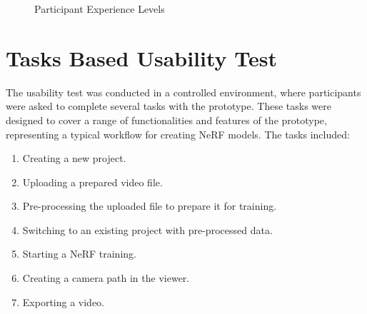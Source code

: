 \begin{figure}[htb]
  \centering
  \caption{Participant Experience Levels}
  \label{fig:study:experience}  
\end{figure}

\section{Tasks Based Usability Test}
\label{sec:study:tasks}

The usability test was conducted in a controlled environment, where participants were asked to complete several tasks with the prototype.
These tasks were designed to cover a range of functionalities and features of the prototype, representing a typical workflow for creating NeRF models.
The tasks included:

\begin{enumerate}
  \item Creating a new project.
  \item Uploading a prepared video file.
  \item Pre-processing the uploaded file to prepare it for training.
  \item Switching to an existing project with pre-processed data.
  \item Starting a NeRF training.
  \item Creating a camera path in the viewer.
  \item Exporting a video.
\end{enumerate}

